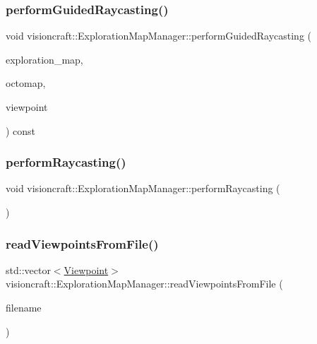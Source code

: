 \subsubsection{\texorpdfstring{perform\+Guided\+Raycasting()}{performGuidedRaycasting()}}
{\footnotesize\ttfamily void visioncraft\+::\+Exploration\+Map\+Manager\+::perform\+Guided\+Raycasting (\begin{DoxyParamCaption}\item[{std\+::shared\+\_\+ptr$<$ octomap\+::\+Color\+Oc\+Tree $>$ \&}]{exploration\+\_\+map,  }\item[{std\+::shared\+\_\+ptr$<$ octomap\+::\+Color\+Oc\+Tree $>$ \&}]{octomap,  }\item[{\hyperlink{classvisioncraft_1_1Viewpoint}{Viewpoint} \&}]{viewpoint }\end{DoxyParamCaption}) const\hspace{0.3cm}{\ttfamily [inline]}}

\mbox{\label{classvisioncraft_1_1ExplorationMapManager_a7aedf7592bdd591d87717bceb076d1f8}} 
\subsubsection{\texorpdfstring{perform\+Raycasting()}{performRaycasting()}}
{\footnotesize\ttfamily void visioncraft\+::\+Exploration\+Map\+Manager\+::perform\+Raycasting (\begin{DoxyParamCaption}{ }\end{DoxyParamCaption})\hspace{0.3cm}{\ttfamily [inline]}}

\mbox{\label{classvisioncraft_1_1ExplorationMapManager_a095e13f3f1d13bcc5f7efa2a57ac77f7}} 
\subsubsection{\texorpdfstring{read\+Viewpoints\+From\+File()}{readViewpointsFromFile()}}
{\footnotesize\ttfamily std\+::vector$<$\hyperlink{classvisioncraft_1_1Viewpoint}{Viewpoint}$>$ visioncraft\+::\+Exploration\+Map\+Manager\+::read\+Viewpoints\+From\+File (\begin{DoxyParamCaption}\item[{const std\+::string \&}]{filename }\end{DoxyParamCaption})\hspace{0.3cm}{\ttfamily [inline]}}

